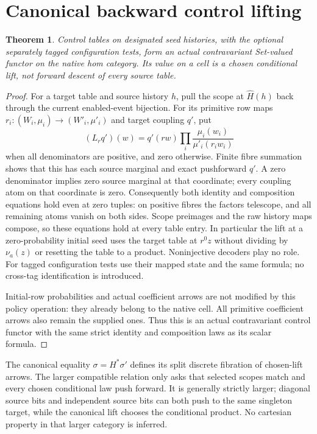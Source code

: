 \documentclass[11pt]{article}
\newtheorem{theorem}{Theorem}\newtheorem{definition}{Definition}
\begin{document}
\section{Canonical backward control lifting}
\begin{theorem}
Control tables on designated seed histories, with the optional separately
tagged configuration tests, form an actual contravariant Set-valued functor
on the native hom category. Its value on a cell is a chosen conditional
lift, not forward descent of every source table.
\end{theorem}
\begin{proof}
For a target table and source history $h$, pull the scope at $\widehat H(h)$
back through the current enabled-event bijection. For its primitive row maps
$r_i:(W_i,\mu_i)\to(W'_i,\mu'_i)$ and target coupling $q'$, put
\[
 (L_r q')(w)=q'(r w)\prod_i\frac{\mu_i(w_i)}{\mu'_i(r_iw_i)}
\]
when all denominators are positive, and zero otherwise. Finite fibre summation
shows that this has each source marginal and exact pushforward $q'$.
A zero denominator implies zero source marginal at that coordinate; every
coupling atom on that coordinate is zero. Consequently both identity and
composition equations hold even at zero tuples: on positive fibres the
factors telescope, and all remaining atoms vanish on both sides.
Scope preimages and the raw history maps compose, so these equations hold
at every table entry. In particular the lift at a zero-probability initial
seed uses the target table at $r^0z$ without dividing by $\nu_a(z)$ or
resetting the table to a product. Noninjective decoders play no role.
For tagged configuration tests use their mapped state and the same formula;
no cross-tag identification is introduced.

Initial-row probabilities and actual coefficient arrows are not modified
by this policy operation: they already belong to the native cell. All
primitive coefficient arrows also remain the supplied ones. Thus this is
an actual contravariant control functor with the same strict identity and
composition laws as its scalar formula.
\end{proof}
The canonical equality $\sigma=H^*\sigma'$ defines its split discrete
fibration of chosen-lift arrows. The larger compatible relation only asks
that selected scopes match and every chosen conditional law push forward.
It is generally strictly larger; diagonal source bits and independent source
bits can both push to the same singleton target, while the canonical lift
chooses the conditional product. No cartesian property in that larger
category is inferred.
\end{document}
